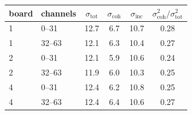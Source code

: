\begin{tabular}{llcccc}
\toprule
board & channels & $\sigma_\mathrm{tot}$ & $\sigma_\mathrm{coh}$ & $\sigma_\mathrm{inc}$ & $\sigma_\mathrm{coh}^2/\sigma_\mathrm{tot}^2$ \\
\midrule
1 & 0--31 & 12.7 & 6.7 & 10.7 & 0.28 \\
1 & 32--63 & 12.1 & 6.3 & 10.4 & 0.27 \\
2 & 0--31 & 12.1 & 5.9 & 10.6 & 0.24 \\
2 & 32--63 & 11.9 & 6.0 & 10.3 & 0.25 \\
4 & 0--31 & 12.4 & 6.2 & 10.8 & 0.25 \\
4 & 32--63 & 12.4 & 6.4 & 10.6 & 0.27 \\
\bottomrule
\end{tabular}
